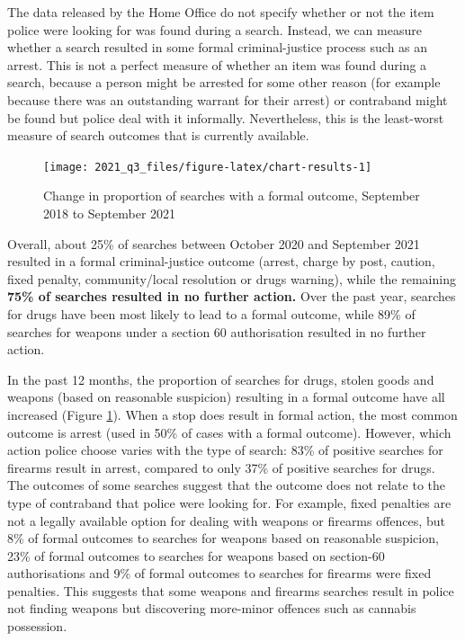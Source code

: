 \documentclass[
  a4paper,
  twoside, 11pt]{article}
\begin{document}
The data released by the Home Office do not specify whether or not the item police were looking for was found during a search. Instead, we can measure whether a search resulted in some formal criminal-justice process such as an arrest. This is not a perfect measure of whether an item was found during a search, because a person might be arrested for some other reason (for example because there was an outstanding warrant for their arrest) or contraband might be found but police deal with it informally. Nevertheless, this is the least-worst measure of search outcomes that is currently available.



\begin{figure}[tb]

{\centering \texttt{[image: 2021\_q3\_files/figure-latex/chart-results-1]} 

}

\caption{Change in proportion of searches with a formal outcome, September 2018 to September 2021}\label{fig:chart-results}
\end{figure}

Overall, about 25\% of searches between October 2020 and September 2021 resulted in a formal criminal-justice outcome (arrest, charge by post, caution, fixed penalty, community/local resolution or drugs warning), while the remaining \textbf{75\% of searches resulted in no further action.} Over the past year, searches for drugs have been most likely to lead to a formal outcome, while 89\% of searches for weapons under a section 60 authorisation resulted in no further action.

In the past 12 months, the proportion of searches for drugs, stolen goods and weapons (based on reasonable suspicion) resulting in a formal outcome have all increased (Figure \ref{fig:chart-results}). When a stop does result in formal action, the most common outcome is arrest (used in 50\% of cases with a formal outcome). However, which action police choose varies with the type of search: 83\% of positive searches for firearms result in arrest, compared to only 37\% of positive searches for drugs. The outcomes of some searches suggest that the outcome does not relate to the type of contraband that police were looking for. For example, fixed penalties are not a legally available option for dealing with weapons or firearms offences, but 8\% of formal outcomes to searches for weapons based on reasonable suspicion, 23\% of formal outcomes to searches for weapons based on section-60 authorisations and 9\% of formal outcomes to searches for firearms were fixed penalties. This suggests that some weapons and firearms searches result in police not finding weapons but discovering more-minor offences such as cannabis possession.
\end{document}
